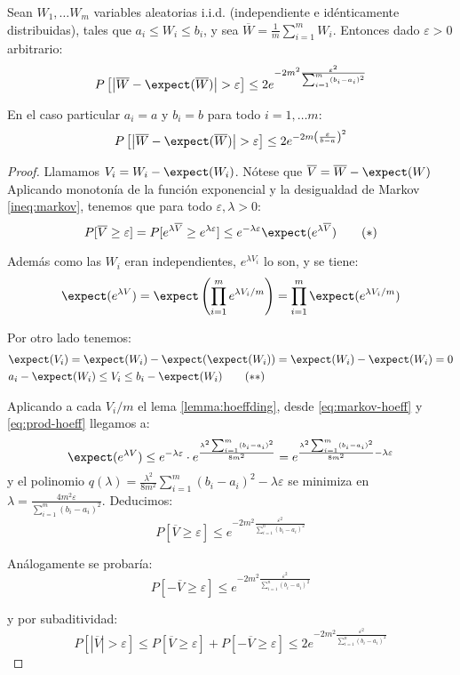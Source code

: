 \begin{lemma}
 Sean $W_1, \ldots W_m$ variables aleatorias i.i.d. (independiente e idénticamente distribuidas), tales que 
 $a_i \le W_i \le b_i$, y sea $\overline{W} = \frac{1}{m} \sum_{i=1}^m W_i$. Entonces dado $\varepsilon > 0$ arbitrario:
 \[
   P\left[\left| \overline{W} - \expect(\overline{W}) \right| > \varepsilon \right] \le 2e^{-2m^2 \frac{\varepsilon^2}{\sum_{i=1}^m (b_i-a_i)^2}}
 \]
 
 En el caso particular $a_i = a$ y $b_i = b$ para todo $i=1, \ldots m$:
 \[
   P\left[\left| \overline{W} - \expect(\overline{W}) \right| > \varepsilon \right] \le 2e^{-2m \left(\frac{\varepsilon}{b-a}\right)^2}
 \] 
 \label{ineq:hoeffding}
\end{lemma}

\begin{proof}
 Llamamos $V_i = W_i - \expect(W_i)$. Nótese que $\overline{V} = \overline{W} - \expect(W)$
 Aplicando monotonía de la función exponencial y la desigualdad de Markov \ref{ineq:markov}, tenemos que 
 para todo $\varepsilon, \lambda > 0$:
 \begin{equation}
 P[\overline{V} \ge \varepsilon] = P[e^{\lambda\overline{V}} \ge e^{\lambda \varepsilon}]
 \le e^{-\lambda \varepsilon} \expect(e^{\lambda \overline{V}})
 \label{eq:markov-hoeff}\tag{$\ast$}
 \end{equation}
 
 Además como las $W_i$ eran independientes, $e^{\lambda V_i}$ lo son, y se tiene:
 \[
   \expect(e^{\lambda V}) = \expect\left(\prod_{i=1}^m e^{\lambda V_i / m}\right) = \prod_{i=1}^m \expect(e^{\lambda V_i/m})
 \]
 
 Por otro lado tenemos:
 \begin{align}
  & \expect(V_i) = \expect(W_i) - \expect(\expect(W_i)) = \expect(W_i) - \expect(W_i) = 0 \nonumber \\
  & a_i-\expect(W_i) \le V_i \le b_i-\expect(W_i)
  \label{eq:prod-hoeff}\tag{$\ast\ast$}
 \end{align}
 
 Aplicando a cada $V_i/m$ el lema \ref{lemma:hoeffding}, desde \eqref{eq:markov-hoeff} y \eqref{eq:prod-hoeff} 
 llegamos a:
 \[
   \expect(e^{\lambda V}) \le e^{-\lambda \varepsilon} \cdot e^{\frac{\lambda^2 \sum_{i=1}^m(b_i-a_i)^2}{8m^2}} = 
   e^{\frac{\lambda^2 \sum_{i=1}^m(b_i-a_i)^2}{8m^2} - \lambda\varepsilon}
 \]
 y el polinomio $q(\lambda)= \frac{\lambda^2}{8m^2} \sum_{i=1}^m(b_i-a_i)^2 - \lambda\varepsilon$ se minimiza en 
 $\lambda = \frac{4m^2\varepsilon}{\sum_{i=1}^m(b_i-a_i)^2}$. Deducimos:
 \[
   P[\overline{V} \ge \varepsilon] \le e^{-2m^2 \frac{\varepsilon^2}{\sum_{i=1}^n (b_i-a_i)^2}}
 \]
 
 Análogamente se probaría:
 \[
   P[-\overline{V} \ge \varepsilon] \le e^{-2m^2 \frac{\varepsilon^2}{\sum_{i=1}^n (b_i-a_i)^2}}
 \]
 
 y por subaditividad: 
 \[
   P[|\overline{V}| > \varepsilon] \le P[\overline{V} \ge \varepsilon] + P[-\overline{V} \ge \varepsilon]
   \le 2e^{-2m^2 \frac{\varepsilon^2}{\sum_{i=1}^n (b_i-a_i)^2}}
 \]
 
\end{proof}
